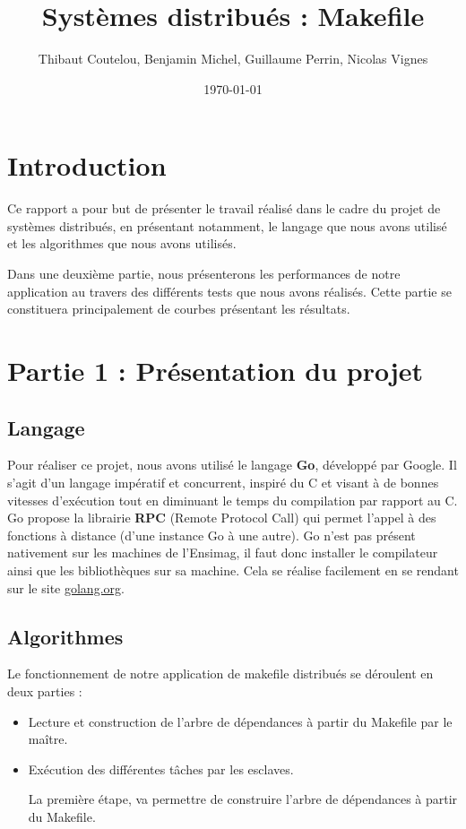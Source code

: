 \documentclass[a4paper,11pt]{article}
\title{Systèmes distribués : Makefile}
\author{Thibaut Coutelou, Benjamin Michel, Guillaume Perrin, Nicolas Vignes}
\date{\today}
\begin{document}
\maketitle

\setlength{\parskip}{2mm}

\section{Introduction}
Ce rapport a pour but de présenter le travail réalisé dans le cadre du projet de systèmes distribués, en présentant notamment, le langage que nous avons utilisé et les algorithmes que nous avons utilisés.

Dans une deuxième partie, nous présenterons les performances de notre application au travers des différents tests que nous avons réalisés. Cette partie se constituera principalement de courbes présentant les résultats.

\section{Partie 1 : Présentation du projet}
\subsection{Langage}
Pour réaliser ce projet, nous avons utilisé le langage \textbf{Go}, développé par Google. Il s'agit d'un langage impératif et concurrent, inspiré du C et visant à de bonnes vitesses d'exécution tout en diminuant le temps du compilation par rapport au C. Go propose la librairie \textbf{RPC} (Remote Protocol Call) qui permet l'appel à des fonctions à distance (d'une instance Go à une autre). Go n'est pas présent nativement sur les machines de l'Ensimag, il faut donc installer le compilateur ainsi que les bibliothèques sur sa machine. Cela se réalise facilement en se rendant sur le site \href{http://golang.org/doc/install#download}{golang.org}.

\subsection{Algorithmes}
Le fonctionnement de notre application de makefile distribués se déroulent en deux parties :
\begin{itemize}
\item Lecture et construction de l'arbre de dépendances à partir du Makefile par le maître.
\item Exécution des différentes tâches par les esclaves.

La première étape, va permettre de construire l'arbre de dépendances à partir du Makefile.

\end{itemize}
\end{document}

